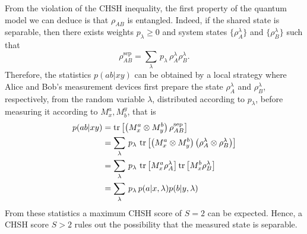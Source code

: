 From the violation of the CHSH inequality, the first property of the quantum model we can deduce is that $\rho_{AB}$ is entangled.
Indeed, if the shared state is separable, then there exists weights $p_\lambda\geq 0$ and system states $\{\rho_{A}^\lambda\}$ and $\{\rho_{B}^\lambda\}$ such that
\begin{equation}
	\rho_{AB}^\text{sep} = \sum_\lambda\, p_\lambda\, \rho_{A}^\lambda \rho_B^\lambda.
\end{equation}
Therefore, the statistics $p(ab|xy)$ can be obtained by a local strategy where Alice and Bob's measurement devices first prepare the state $\rho_A^\lambda$ and $\rho_B^\lambda$, respectively, from the random variable $\lambda$, distributed according to $p_\lambda$, before measuring it according to $M^a_x,M_b^y$, that is
\begin{equation}
	\begin{split}
		p(ab|xy) &= \trr{\left(M^a_x \otimes M^b_y \right) \rho_{AB}^\text{sep}}  \\
				 & = \sum_\lambda\, p_\lambda \, \trr{\left(M^a_x \otimes M^b_y \right)\left(\rho_{A}^\lambda \otimes \rho_B^\lambda\right)} \\
				 & = \sum_\lambda\, p_\lambda\, \trr{M^a_x \rho_A^\lambda} \trr{M^b_x \rho_B^\lambda} \\
				 & = \sum_\lambda\, p_\lambda\, p(a|x,\lambda) p(b|y,\lambda)
	\end{split}
\end{equation}
From these statistics a maximum CHSH score of $S=2$ can be expected.
Hence, a CHSH score $S>2$ rules out the possibility that the measured state is separable.

\medbreak

